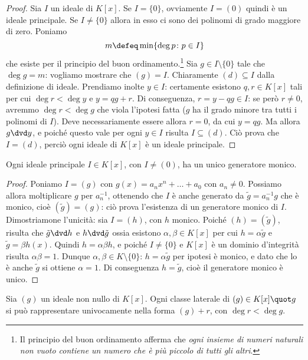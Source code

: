 \begin{proof}
	Sia $I$ un ideale di $K[x]$.
	Se $I=\{0\}$, ovviamente $I=(0)$ quindi è un ideale principale.
	Se $I\ne\{0\}$ allora in esso ci sono dei polinomi di grado maggiore di zero.
	Poniamo
	\begin{equation*}
		m\defeq\min\{\deg p\colon p\in I\}
	\end{equation*}
	che esiste per il principio del buon ordinamento.\footnote{Il principio del buon ordinamento afferma che \emph{ogni insieme di numeri naturali non vuoto contiene un numero che è più piccolo di tutti gli altri}.}
	Sia $g\in I\setminus\{0\}$ tale che $\deg g=m$: vogliamo mostrare che $(g)=I$.
	Chiaramente $(d)\subseteq I$ dalla definizione di ideale.
	Prendiamo inolte $y\in I$: certamente esistono $q,r\in K[x]$ tali per cui $\deg r<\deg y$ e $y=qg+r$.
	Di conseguenza, $r=y-qg\in I$: se però $r\ne 0$, avremmo $\deg r<\deg g$ che viola l'ipotesi fatta ($g$ ha il grado minore tra tutti i polinomi di $I$).
	Deve necessariamente essere allora $r=0$, da cui $y=qg$.
	Ma allora $g\dvd y$, e poich\'e questo vale per ogni $y\in I$ risulta $I\subseteq (d)$.
	Ciò prova che $I=(d)$, perciò ogni ideale di $K[x]$ è un ideale principale.
\end{proof}
\begin{corollario} \label{c:unicita-generatore-monico}
	Ogni ideale principale $I\in K[x]$, con $I\ne (0)$, ha un unico generatore monico.
\end{corollario}
\begin{proof}
	Poniamo $I=(g)$ con $g(x) = a_nx^n+\dots+a_0$ con $a_n\ne 0$.
	Possiamo allora moltiplicare $g$ per $a_n^{-1}$, ottenendo che $I$ è anche generato da $\tilde{g} = a_n^{-1}g$ che è monico, cioè $(\tilde{g}) = (g)$: ciò prova l'esistenza di un generatore monico di $I$.
	Dimostriamone l'unicità: sia $I=(h)$, con $h$ monico.
	Poich\'e $(h)=(\tilde{g})$, risulta che $\tilde{g}\dvd h$ e $h\dvd \tilde{g}$ ossia esistono $\alpha,\beta\in K[x]$ per cui $h=\alpha\tilde{g}$ e $\tilde{g}=\beta h(x)$.
	Quindi $h=\alpha\beta h$, e poich\'e $I\ne\{0\}$ e $K[x]$ è un dominio d'integrità risulta $\alpha\beta=1$.
	Dunque $\alpha,\beta\in K\setminus\{0\}$: $h=\alpha\tilde{g}$ per ipotesi è monico, e dato che lo è anche $\tilde{g}$ si ottiene $\alpha=1$.
	Di conseguenza $h=\tilde{g}$, cioè il generatore monico è unico.
\end{proof}
\begin{teorema} \label{t:rappresentazione-laterali-ideale-principale}
	Sia $(g)$ un ideale non nullo di $K[x]$.
	Ogni classe laterale di $(g)\in K[x]\quot g$ si può rappresentare univocamente nella forma $(g)+r$, con $\deg r<\deg g$.
\end{teorema}
